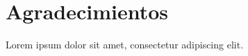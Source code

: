\documentclass[11pt, oneside]{book}
\begin{document}
\chapter*{Agradecimientos}

\noindent Lorem ipsum dolor sit amet, consectetur adipiscing elit.







\end{document}
